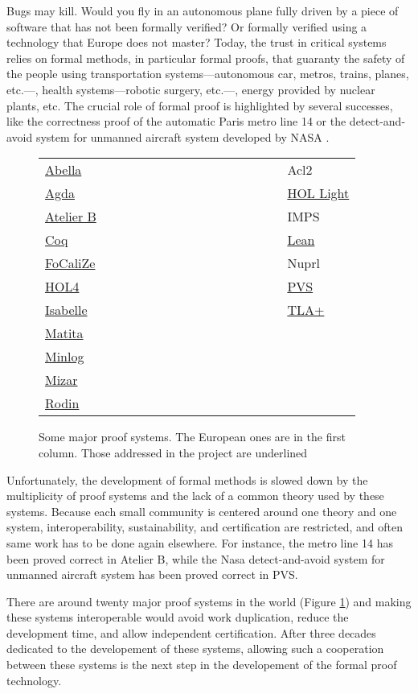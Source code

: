 Bugs may kill. Would you fly in an autonomous plane fully driven by a
piece of software that has not been formally verified?  Or formally
verified using a technology that Europe does not master? Today, the
trust in critical systems relies on formal methods, in particular
formal proofs, that guaranty the safety of the people using
transportation systems---autonomous car, metros, trains, planes,
etc.---, health systems---robotic surgery, etc.---, energy provided by
nuclear plants, etc. The crucial role of formal proof is highlighted
by several successes, like the correctness proof of the automatic
Paris metro line 14 \cite{metro14} or the detect-and-avoid system for
unmanned aircraft system developed by NASA \cite{Munoz16}.

\thispagestyle{empty}

\begin{figure}
\begin{tabular}{ll}
  {\sc \underline{Abella}}~~~~~~~~~~~~~~~~~~~~~~~~~~~~~~&{\sc Acl2}\\
{\sc \underline{Agda}} &  {\sc \underline{HOL Light}}\\
{\sc \underline{Atelier B}} &  {\sc IMPS}\\
{\sc \underline{Coq}}  &  {\sc \underline{Lean}}\\
{\sc \underline{FoCaliZe}}  &  {\sc Nuprl}\\
{\sc \underline{HOL4}}  &  {\sc \underline{PVS}}\\
{\sc \underline{Isabelle}}  &  {\sc \underline{TLA+}}\\
{\sc \underline{Matita}}\\
{\sc \underline{Minlog}}\\
{\sc \underline{Mizar}}\\
{\sc \underline{Rodin}}\\
\end{tabular}
\caption{Some major proof systems. The European ones are in the first column.
  Those addressed in the project are underlined\label{systems}}
\end{figure}

Unfortunately, the development of formal methods is slowed down by the
multiplicity of proof systems and the lack of a common theory used by
these systems. Because each small community is centered around one theory
and one system, interoperability, sustainability, and certification are
restricted, and often same work has to be done again elsewhere.  For
instance, the metro line 14 has been proved correct in {\sc Atelier
B}, while the Nasa detect-and-avoid system for unmanned aircraft
system has been proved correct in {\sc PVS}.

There are around twenty major proof systems in the world
(Figure \ref{systems}) and making these systems interoperable would avoid work
duplication, reduce the development time, and allow independent
certification.  After three decades dedicated to the developement of
these systems, allowing such a cooperation between these systems is
the next step in the developement of the formal proof technology.

